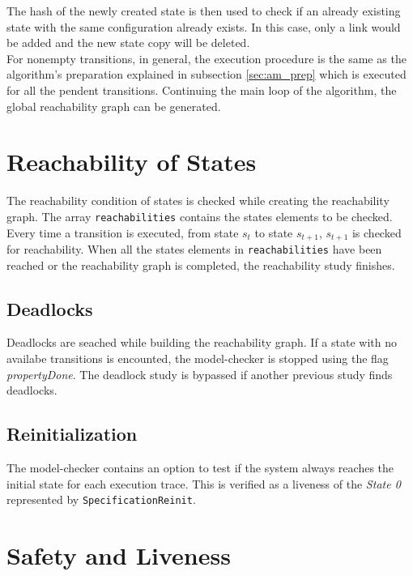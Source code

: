 \documentclass[12pt]{article}
\begin{document}
The hash of the newly created state is then used to check if an already existing state with the same configuration already exists. In this case, only a link would be added and the new state copy will be deleted.\\

For nonempty transitions, in general, the execution procedure is the same as the algorithm's preparation explained in subsection \ref{sec:am_prep} which is executed for all the pendent transitions. Continuing the main loop of the algorithm, the global reachability graph can be generated.


\section{Reachability of States}
The reachability condition of states is checked while creating the reachability graph. The array \texttt{reachabilities} contains the states elements to be checked. Every time a transition is executed, from state $s_t$ to state $s_{t+1}$, $s_{t+1}$ is checked for reachability. When all the states elements in \texttt{reachabilities} have been reached or the reachability graph is completed, the reachability study finishes.

\subsection{Deadlocks}
Deadlocks are seached while building the reachability graph. If a state with no availabe transitions is encounted, the model-checker is stopped using the flag \textit{propertyDone}. The deadlock study is bypassed if another previous study finds deadlocks.

\subsection{Reinitialization}
The model-checker contains an option to test if the system always reaches the initial state for each execution trace. This is verified as a liveness of the \textit{State 0} represented by \texttt{SpecificationReinit}.

\section{Safety and Liveness}
\end{document}
